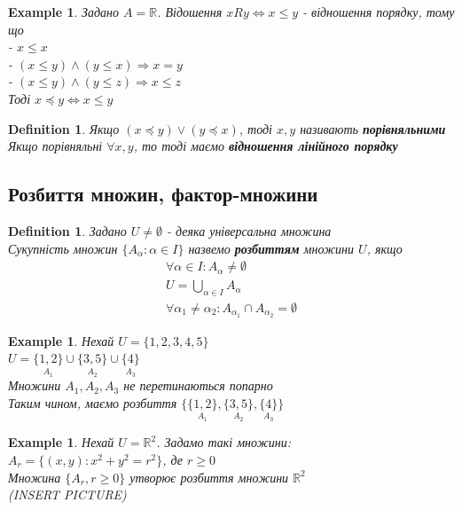 \documentclass[a4paper, 14pt]{extarticle}
\def\huge{\displaystyle}
\theoremstyle{theoremdd}
\theoremstyle{theoremdd}
\newtheorem{definition}[theorem]{Definition}
\theoremstyle{theoremdd}
\theoremstyle{theoremdd}
\newtheorem{example}[theorem]{Example}
\theoremstyle{theoremdd}
\theoremstyle{theoremdd}
\theoremstyle{theoremdd}
\theoremstyle{theoremdd}
\begin{document}
\begin{example}
Задано $A = \mathbb{R}$. Відошення $xRy \iff x \leq y$ - відношення порядку, тому що\\
- $x \leq x$ \\
- $(x \leq y) \wedge (y \leq x) \Rightarrow x = y$ \\
- $(x \leq y) \wedge (y \leq z) \Rightarrow x \leq z$\\
Тоді
$x \preceq y \iff x \leq y$
\end{example}

\begin{definition}
Якщо $(x \preceq y) \vee (y \preceq x)$, тоді $x,y$ називають \textbf{порівняльними}\\
Якщо порівняльні $\forall x,y$, то тоді маємо \textbf{відношення лінійного порядку}
\end{definition}

\subsection{Розбиття множин, фактор-множини}
\begin{definition}
Задано $U \neq \emptyset$ - деяка універсальна множина\\
Сукупність множин $\{A_{\alpha}: \alpha \in I\}$ назвемо \textbf{розбиттям} множини $U$, якщо
\begin{align*}
\forall \alpha \in I: A_\alpha \neq \emptyset\\
U = \huge\bigcup_{\alpha \in I} A_\alpha\\
\forall \alpha_1 \neq \alpha_2: A_{\alpha_1} \cap A_{\alpha_2} = \emptyset
\end{align*}
\end{definition}

\begin{example}
Нехай $U = \{1,2,3,4,5\}$\\
$U = \underset{A_1}{\{1,2\}} \cup \underset{A_2}{\{3,5\}} \cup \underset{A_3}{\{4\}}$\\
Множини $A_1,A_2,A_3$ не перетинаються попарно\\
Таким чином, маємо розбиття $\{\underset{A_1}{\{1,2\}}, \underset{A_2}{\{3,5\}}, \underset{A_3}{\{4\}} \}$
\end{example}

\begin{example}
Нехай $U = \mathbb{R}^2$. Задамо такі множини:\\
$A_r = \{(x,y): x^2+y^2 = r^2\}$, де $r \geq 0$\\
Множина $\{A_r, r \geq 0\}$ утворює розбиття множини $\mathbb{R}^2$\\
(INSERT PICTURE)
\end{example}
\end{document}
